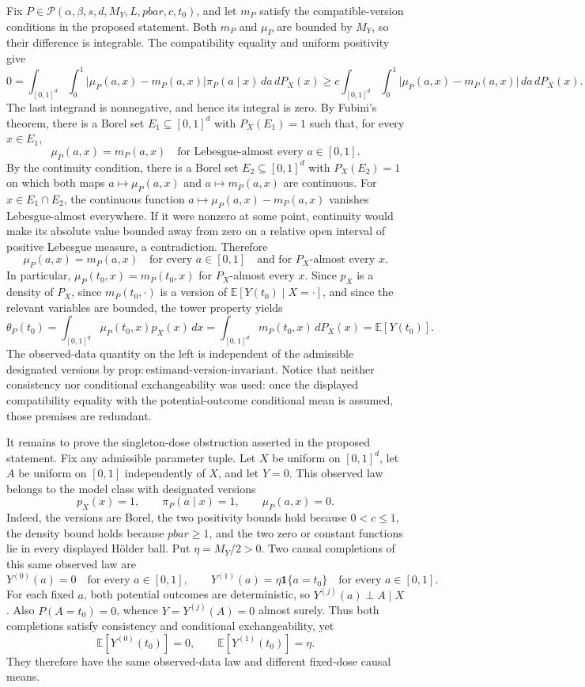 Fix \(P\in\mathcal P(\alpha,\beta,s,d,M_Y,L,pbar,c,t_0)\), and let \(m_P\) satisfy the compatible-version conditions in the proposed statement. Both \(m_P\) and \(\mu_P\) are bounded by \(M_Y\), so their difference is integrable. The compatibility equality and uniform positivity give
\[
0=\int_{[0,1]^d}\int_0^1
\lvert\mu_P(a,x)-m_P(a,x)\rvert\pi_P(a\mid x)\,da\,dP_X(x)
\ge c\int_{[0,1]^d}\int_0^1
\lvert\mu_P(a,x)-m_P(a,x)\rvert\,da\,dP_X(x).
\]
The last integrand is nonnegative, and hence its integral is zero. By Fubini's theorem, there is a Borel set \(E_1\subseteq[0,1]^d\) with \(P_X(E_1)=1\) such that, for every \(x\in E_1\),
\[
\mu_P(a,x)=m_P(a,x)
\quad\text{for Lebesgue-almost every }a\in[0,1].
\]
By the continuity condition, there is a Borel set \(E_2\subseteq[0,1]^d\) with \(P_X(E_2)=1\) on which both maps \(a\mapsto\mu_P(a,x)\) and \(a\mapsto m_P(a,x)\) are continuous. For \(x\in E_1\cap E_2\), the continuous function \(a\mapsto\mu_P(a,x)-m_P(a,x)\) vanishes Lebesgue-almost everywhere. If it were nonzero at some point, continuity would make its absolute value bounded away from zero on a relative open interval of positive Lebesgue measure, a contradiction. Therefore
\[
\mu_P(a,x)=m_P(a,x)
\quad\text{for every }a\in[0,1]
\quad\text{and for }P_X\text{-almost every }x.
\]
In particular, \(\mu_P(t_0,x)=m_P(t_0,x)\) for \(P_X\)-almost every \(x\). Since \(p_X\) is a density of \(P_X\), since \(m_P(t_0,\cdot)\) is a version of \(\mathbb E[Y(t_0)\mid X=\cdot]\), and since the relevant variables are bounded, the tower property yields
\[
\theta_P(t_0)
=\int_{[0,1]^d}\mu_P(t_0,x)p_X(x)\,dx
=\int_{[0,1]^d}m_P(t_0,x)\,dP_X(x)
=\mathbb E[Y(t_0)].
\]
The observed-data quantity on the left is independent of the admissible designated versions by \(\mathrm{prop:estimand\text{-}version\text{-}invariant}\). Notice that neither consistency nor conditional exchangeability was used: once the displayed compatibility equality with the potential-outcome conditional mean is assumed, those premises are redundant.

It remains to prove the singleton-dose obstruction asserted in the proposed statement. Fix any admissible parameter tuple. Let \(X\) be uniform on \([0,1]^d\), let \(A\) be uniform on \([0,1]\) independently of \(X\), and let \(Y=0\). This observed law belongs to the model class with designated versions
\[
p_X(x)=1,\qquad \pi_P(a\mid x)=1,\qquad \mu_P(a,x)=0.
\]
Indeed, the versions are Borel, the two positivity bounds hold because \(0<c\le1\), the density bound holds because \(pbar\ge1\), and the two zero or constant functions lie in every displayed Hölder ball. Put \(\eta=M_Y/2>0\). Two causal completions of this same observed law are
\[
Y^{(0)}(a)=0\quad\text{for every }a\in[0,1],
\qquad
Y^{(1)}(a)=\eta\mathbf 1\{a=t_0\}
\quad\text{for every }a\in[0,1].
\]
For each fixed \(a\), both potential outcomes are deterministic, so \(Y^{(j)}(a)\perp A\mid X\). Also \(P(A=t_0)=0\), whence \(Y=Y^{(j)}(A)=0\) almost surely. Thus both completions satisfy consistency and conditional exchangeability, yet
\[
\mathbb E[Y^{(0)}(t_0)]=0,
\qquad
\mathbb E[Y^{(1)}(t_0)]=\eta.
\]
They therefore have the same observed-data law and different fixed-dose causal means.


